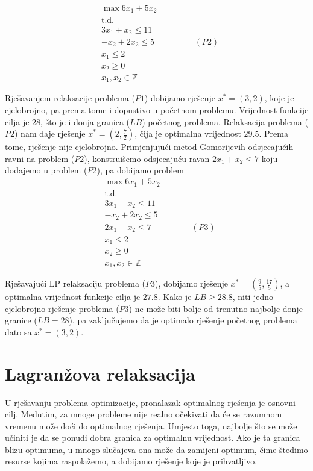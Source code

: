 \documentclass[a4paper, utf8, 11pt, colorlinks]{book}
\theoremstyle{definition}
\begin{document}
\begin{align*}
    &\max 6 x_1 + 5 x_2 \\
      &  \mbox{t.d. } \\
    & 3x_1 + x_2 \leq 11 \\
    & - x_2 + 2 x_2 \leq 5 \hspace{2cm} (P2) \\
    & x_1  \leq 2 \\
    & x_2 \geq 0 \\
    & x_1, x_2 \in \mathbb{Z}
\end{align*}

Rješavanjem relaksacije problema ($P1$) dobijamo rješenje $x^*=(3,2)$, koje je cjelobrojno, pa prema tome i dopustivo u početnom problemu. Vrijednost funkcije cilja je 28, što je i donja granica ($LB$) početnog problema. Relaksacija problema ($P2$) nam daje rješenje $x^*=(2, \frac{7}{2})$, čija je optimalna vrijednost $29.5$.  Prema tome, rješenje nije cjelobrojno. Primjenjujući metod Gomorijevih odsjecajućih ravni na problem ($P2$), konstruišemo odsjecajuću ravan $2x_1 + x_2 \leq 7$ koju dodajemo u problem ($P2$), pa dobijamo problem 
\begin{align*}
    &\max 6 x_1 + 5 x_2 \\
    & \mbox{t.d. } \\
    & 3x_1 + x_2 \leq 11 \\
    & - x_2 + 2 x_2 \leq 5  \\
    & 2x_1 + x_2 \leq 7 \hspace{2cm} (P3)\\ 
    & x_1  \leq 2 \\
    & x_2 \geq 0 \\
    & x_1, x_2 \in \mathbb{Z}
\end{align*}

Rješavajući LP relaksaciju problema ($P3$), dobijamo rješenje $x^*=(\frac{9}{5}, \frac{17}{5})$, a  optimalna vrijednost funkcije cilja je $27.8$. Kako je $LB \geq 28.8$, niti jedno cjelobrojno rješenje problema ($P3$) ne može biti bolje od trenutno najbolje donje granice ($LB=28$), pa zaključujemo da je optimalo rješenje početnog problema dato sa $x^*=(3,2)$. 

\section{Lagranžova relaksacija}
U rješavanju problema optimizacije, pronalazak optimalnog rješenja je osnovni cilj. Međutim, za mnoge probleme nije realno očekivati da će se razumnom vremenu može doći do optimalnog rješenja. Umjesto toga, najbolje što se može učiniti je da se ponudi dobra  granica za optimalnu vrijednost. Ako je ta granica blizu optimuma, u mnogo slučajeva ona može da zamijeni optimum, čime štedimo resurse kojima raspolažemo, a dobijamo rješenje koje je prihvatljivo.  
\end{document}
